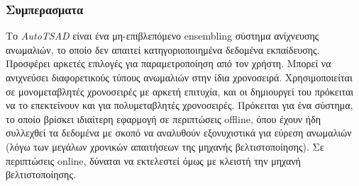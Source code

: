 \subsubsection{Συμπερασματα}
Το \emph{AutoTSAD} είναι ένα μη-επιβλεπόμενο ensembling σύστημα ανίχνευσης ανωμαλιών, το οποίο δεν απαιτεί κατηγοριοποιημένα δεδομένα εκπαίδευσης. Προσφέρει αρκετές επιλογές για παραμετροποίηση από τον χρήστη. Μπορεί να ανιχνεύσει διαφορετικούς τύπους ανωμαλιών στην ίδια χρονοσειρά. Χρησιμοποιείται σε μονομεταβλητές χρονοσειρές με αρκετή επιτυχία, και οι δημιουργεί του πρόκειται να το επεκτείνουν και για πολυμεταβλητές χρονοσειρές. Πρόκειται για ένα σύστημα, το οποίο βρίσκει ιδιαίτερη εφαρμογή σε περιπτώσεις offline, όπου έχουν ήδη συλλεχθεί τα δεδομένα με σκοπό να αναλυθούν εξονυχιστικά για εύρεση ανωμαλιών (λόγω των μεγάλων χρονικών απαιτήσεων της μηχανής βελτιστοποίησης). Σε περιπτώσεις online, δύναται να εκτελεστεί όμως με κλειστή την μηχανή βελτιστοποίησης. 